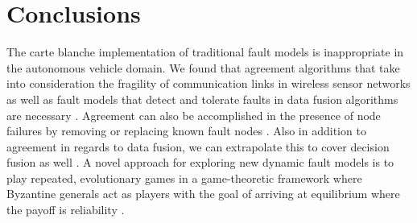 \documentclass[twoside, conference]{IEEEtran}%
\begin{document}
\section{Conclusions}\label{sec:conclusions}
The carte blanche implementation of traditional fault models is inappropriate in the autonomous vehicle domain.  We found that agreement algorithms that take into consideration the fragility of communication links in wireless sensor networks as well as fault models that detect and tolerate faults in data fusion algorithms are necessary \cite{Biely2007,Bader2014}.  Agreement can also be accomplished in the presence of node failures by removing or replacing known fault nodes \cite{Ren2001}.  Also in addition to agreement in regards to data fusion, we can extrapolate this to cover decision fusion as well \cite{Clouqueur2004}.  A novel approach for exploring new dynamic fault models is to play repeated, evolutionary games in a game-theoretic framework where Byzantine generals act as players with the goal of arriving at equilibrium where the payoff is reliability \cite{Ma2008}.



\end{document}

